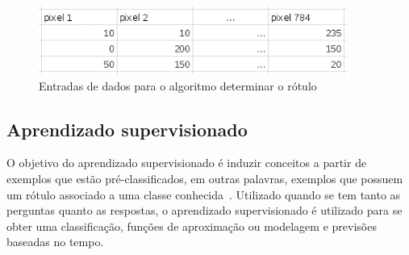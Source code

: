 \begin{figure}[h]
  \centering
  \includegraphics[width=0.9\textwidth]{figuras/tabela_ml_entrada.eps}
  \caption{Entradas de dados para o algoritmo determinar o rótulo}
  \label{fig:tabela_ml_entrada}
\end{figure}

\subsection{Aprendizado supervisionado}

O objetivo do aprendizado supervisionado é induzir conceitos a partir de
exemplos que estão pré-classificados, em outras palavras, exemplos que
possuem um rótulo associado a uma classe conhecida~\cite{bruno2010aprendizadomaquina}.
Utilizado quando se tem tanto as perguntas quanto as respostas, o
aprendizado supervisionado é utilizado para se obter uma classificação,
funções de aproximação ou modelagem e previsões baseadas no tempo.

